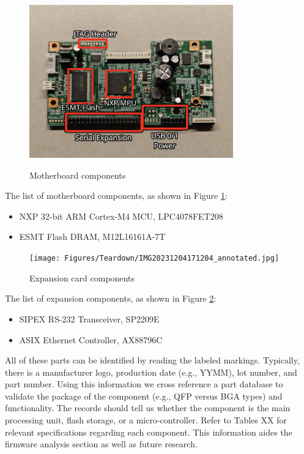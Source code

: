 \begin{figure}[ht]
    \centering
    {\includegraphics[width=88mm,scale=0.5]
    {Figures/Teardown/IMG20231204171516_annotated.jpg}}
    \caption{Motherboard components}
    \label{fig:snbc_btp_s80_motherboard}
\end{figure}

The list of motherboard components, as shown in Figure \ref{fig:snbc_btp_s80_motherboard}:
\begin{itemize}
    \item NXP 32-bit ARM Cortex-M4 MCU, LPC4078FET208
    \item ESMT Flash DRAM, M12L16161A-7T
\end{itemize}

\begin{figure}[ht]
    \centering
    {\texttt{[image: Figures/Teardown/IMG20231204171204\_annotated.jpg]}}
    \caption{Expansion card components}
    \label{fig:snbc_btp_s80_expansion_components}
\end{figure}

The list of expansion components, as shown in Figure \ref{fig:snbc_btp_s80_expansion_components}:
\begin{itemize}
    \item SIPEX RS-232 Transceiver, SP2209E
    \item ASIX Ethernet Controller, AX88796C
\end{itemize}

All of these parts can be identified by reading the labeled markings. Typically, there is a manufacturer logo, production date (e.g., YYMM), lot number, and part number. Using this information we cross reference a part database to validate the package of the component (e.g., QFP versus BGA types) and functionality. The records should tell us whether the component is the main processing unit, flash storage, or a micro-controller. Refer to Tables XX for relevant specifications regarding each component. This information aides the firmware analysis section as well as future research.

